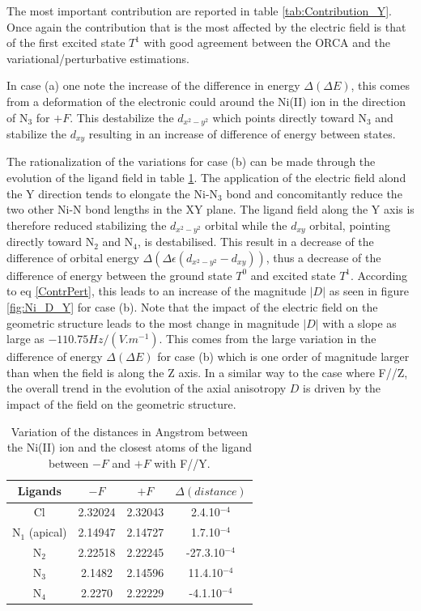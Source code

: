 \documentclass[10pt]{report}
\numberwithin{equation}{section}
\begin{document}
The most important contribution are reported in table \ref{tab:Contribution_Y}. 
Once again the contribution that is the most affected by the electric field is that of the first excited state $T^1$ with good agreement between the ORCA and the variational/perturbative estimations.


In case (a) one note the increase of the difference in energy $\Delta (\Delta E)$, this comes from a deformation of the electronic could around the Ni(II) ion in the direction of N$_3$ for $+F$. 
This destabilize the $d_{x^2-y^2}$ which points directly toward N$_3$ and stabilize the $d_{xy}$ resulting in an increase of difference of energy between states.

The rationalization of the variations for case (b) can be made through the evolution of the ligand field in table \ref{tab:DistanceY}.
The application of the electric field alond the Y direction tends to elongate the Ni-N$_3$ bond and concomitantly reduce the two other Ni-N bond lengths in the XY plane.
The ligand field along the Y axis is therefore reduced stabilizing the $d_{x^2-y^2}$ orbital while the $d_{xy}$ orbital, pointing directly toward N$_2$ and N$_4$, is destabilised. 
This result in a decrease of the difference of orbital energy $\Delta (\Delta \epsilon (d_{x^2-y^2}-d_{xy}))$, thus a decrease of the difference of energy between the ground state $T^0$ and excited state $T^1$.
According to eq \ref{ContrPert}, this leads to an increase of the magnitude $|D|$ as seen in figure \ref{fig:Ni_D_Y} for case (b).
Note that the impact of the electric field on the geometric structure leads to the most change in magnitude $|D|$ with a slope as large as $-110.75 Hz/(V.m^{-1})$.
This comes from the large variation in the difference of energy $\Delta (\Delta E)$ for case (b) which is one order of magnitude larger than when the field is along the Z axis.
In a similar way to the case where F//Z, the overall trend in the evolution of the axial anisotropy $D$ is driven by the impact of the field on the geometric structure.


\begin{table}[h!]
    \centering
    \begin{tabular}{| c | c| c | c |}
        \hline
        Ligands & $-F$ & $+F$ &$\Delta(distance)$\\
        \hline
        Cl & 2.32024& 2.32043&  2.4.10$^{-4}$\\
        N$_1$ (apical) & 2.14947  & 2.14727 &1.7.10$^{-4}$\\
        N$_2$ & 2.22518& 2.22245&-27.3.10$^{-4}$ \\
        N$_3$ & 2.1482& 2.14596&11.4.10$^{-4}$ \\
        N$_4$ & 2.2270& 2.22229 &-4.1.10$^{-4}$\\
        \hline
    \end{tabular}
    \caption{Variation of the distances in Angstrom between the Ni(II) ion and the closest atoms of the ligand between $-F$ and $+F$ with F//Y.}
    \label{tab:DistanceY}
\end{table}
\end{document}

